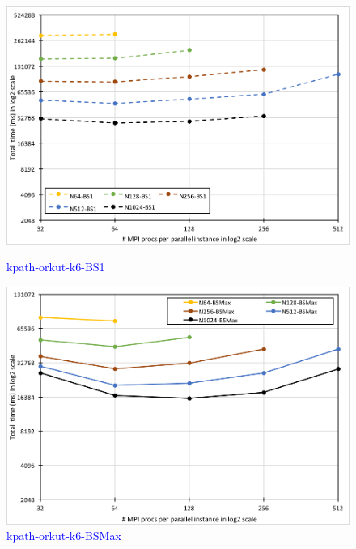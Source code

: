 \begin{figure}[!htb]
\begin{minipage}{0.23\textwidth}
        \centering
        \includegraphics[width=1\columnwidth]{img/kpath-N1N/orkut-k6-BS1.png}
        \caption{\textcolor{blue}{kpath-orkut-k6-BS1}}
        \label{fig:fig-kpath-orkut-k6-BS1.png}
    \end{minipage}   
    \hspace{0mm}
    \begin{minipage}{0.23\textwidth}
        \centering
        \includegraphics[width=1\columnwidth]{img/kpath-N1N/orkut-k6-BSMax.png}
        \caption{\textcolor{blue}{kpath-orkut-k6-BSMax}}
        \label{fig:fig-kpath-orkut-k6-BSMax.png}
    \end{minipage}   
    \hspace{0mm}
    \begin{minipage}{0.23\textwidth}
        \centering

\end{minipage}
\end{figure}

